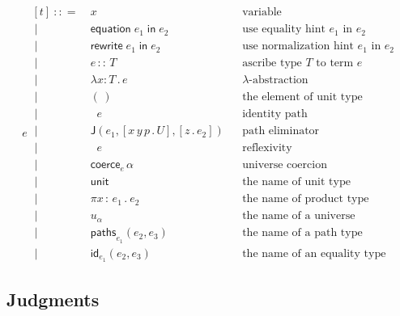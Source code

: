 \documentclass{article}
\newcommand{\T}{T} %
\newcommand{\U}{U} %
\newcommand{\x}{x} %
\newcommand{\e}{e} %
\newcommand{\bnf}{\ \mathrel{{:}{:}{=}}\ }
\newcommand{\bnfor}{\ \mid\ \ }
\newcommand{\lam}[2]{\lambda #1 {:} #2 \,.\,} %
\newcommand{\abst}[2]{[#1 \,.\, #2]} %
\newcommand{\ascribe}[2]{#1 \,{:}{:}\, #2} %
\newcommand{\unitTerm}{(\,)} %
\newcommand{\coerce}[2]{\mathsf{coerce}_{#1} \, #2}
\newcommand{\PrElimS}[3]{\mathsf{J}(#1, #2, #3)} %
\newcommand{\prRefl}[1]{\mathop{\mathsf{idpath}_{#1}}}  %
\newcommand{\juRefl}[1]{\mathop{\mathsf{refl}_{#1}}}    %
\newcommand{\nUnit}{\mathsf{unit}} %
\newcommand{\nProd}[2]{\pi #1\,{:}\,#2 \,.\ } %
\newcommand{\nUniverse}[1]{u_{#1}}  %
\newcommand{\nPrEqual}[3]{\mathsf{paths}_{#1}(#2,#3)} %
\newcommand{\nJuEqual}[3]{\mathsf{id}_{#1}(#2,#3)} %
\newcommand{\equationin}[1]{\mathsf{equation}\; #1 \; \mathsf{in} \;} %
\newcommand{\rewritein}[1]{\mathsf{rewrite}\; #1 \; \mathsf{in} \;} %
\begin{document}
\begin{equation*}
  \e
  \begin{aligned}[t]
    \bnf   {}&  \x   &&\text{variable} \\
    \bnfor {}&  \equationin{\e_1} e_2 &&\text{use equality hint $\e_1$ in $\e_2$} \\
    \bnfor {}&  \rewritein{\e_1} e_2 &&\text{use normalization hint $\e_1$ in $\e_2$} \\
    \bnfor {}&  \ascribe{\e}{\T}  &&\text{ascribe type $\T$ to term $\e$} \\
    \bnfor {}&  \lam{\x}{\T} \e  &&\text{$\lambda$-abstraction} \\
    \bnfor {}&  \unitTerm  &&\text{the element of unit type} \\
    \bnfor {}&  \prRefl{\T}{\e}  &&\text{identity path} \\
    \bnfor {}&  \PrElimS{\e_1}{\abst{x\,y\,p}{\U}}{\abst{z}{\e_2}}  &&\text{path eliminator} \\
    \bnfor {}&  \juRefl{\T} \e  &&\text{reflexivity} \\
    \bnfor {}&  \coerce{\e}{\alpha}  &&\text{universe coercion} \\
    \bnfor {}&  \nUnit  &&\text{the name of unit type} \\
    \bnfor {}&  \nProd{\x}{\e_1} \e_2  &&\text{the name of product type} \\
    \bnfor {}&  \nUniverse{\alpha} &&\text{the name of a universe} \\
    \bnfor {}&  \nPrEqual{\e_1}{\e_2}{\e_3}  &&\text{the name of a path type} \\
    \bnfor {}&  \nJuEqual{\e_1}{\e_2}{\e_3}  &&\text{the name of an equality type}
  \end{aligned}
\end{equation*}

\subsection{Judgments}
\label{sec:bidirectional-judgments}
\end{document}
